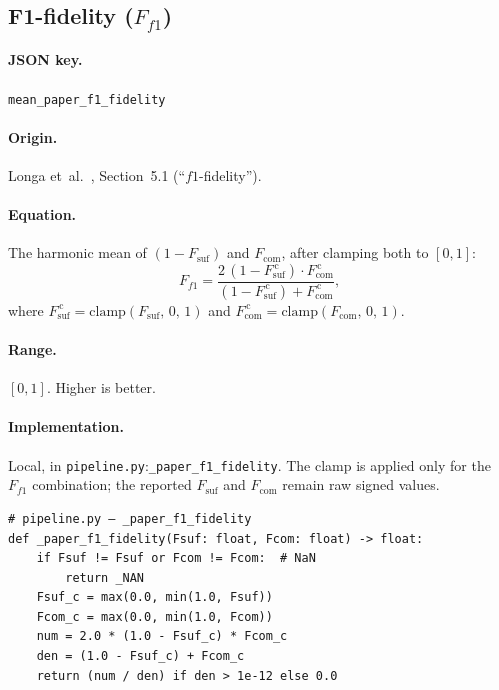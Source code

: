 \documentclass[11pt,a4paper]{article}
\newcommand{\code}[1]{\texttt{#1}}
\newcommand{\jsonkey}[1]{\texttt{#1}}
\begin{document}
\subsection{F1-fidelity (\texorpdfstring{$F_{f1}$}{Ff1})}
\label{sec:ff1}

\paragraph{JSON key.} \jsonkey{mean\_paper\_f1\_fidelity}

\paragraph{Origin.} Longa et~al.~\cite{longa2025}, Section~5.1
(``$f1$-fidelity'').

\paragraph{Equation.}
The harmonic mean of $(1 - F_{\mathrm{suf}})$ and $F_{\mathrm{com}}$, after
clamping both to $[0, 1]$:
\begin{equation}
  F_{f1} = \frac{2\,(1 - F_{\mathrm{suf}}^{\,\mathrm{c}}) \cdot
            F_{\mathrm{com}}^{\,\mathrm{c}}}
           {(1 - F_{\mathrm{suf}}^{\,\mathrm{c}}) +
            F_{\mathrm{com}}^{\,\mathrm{c}}},
  \label{eq:ff1}
\end{equation}
where $F_{\mathrm{suf}}^{\,\mathrm{c}} = \mathrm{clamp}(F_{\mathrm{suf}},\,
0,\,1)$ and $F_{\mathrm{com}}^{\,\mathrm{c}} =
\mathrm{clamp}(F_{\mathrm{com}},\,0,\,1)$.

\paragraph{Range.} $[0, 1]$.  Higher is better.

\paragraph{Implementation.} Local, in
\code{pipeline.py}:\code{\_paper\_f1\_fidelity}.  The clamp is applied only
for the $F_{f1}$ combination; the reported $F_{\mathrm{suf}}$ and
$F_{\mathrm{com}}$ remain raw signed values.

\begin{verbatim}
# pipeline.py — _paper_f1_fidelity
def _paper_f1_fidelity(Fsuf: float, Fcom: float) -> float:
    if Fsuf != Fsuf or Fcom != Fcom:  # NaN
        return _NAN
    Fsuf_c = max(0.0, min(1.0, Fsuf))
    Fcom_c = max(0.0, min(1.0, Fcom))
    num = 2.0 * (1.0 - Fsuf_c) * Fcom_c
    den = (1.0 - Fsuf_c) + Fcom_c
    return (num / den) if den > 1e-12 else 0.0
\end{verbatim}
\end{document}
